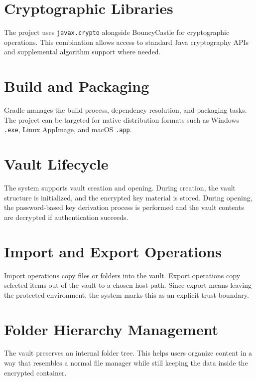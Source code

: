 \section{Cryptographic Libraries}
The project uses \texttt{javax.crypto} alongside BouncyCastle  \cite{bouncycastle} for cryptographic operations. This combination allows access to standard Java cryptography APIs and supplemental algorithm support where needed.

\section{Build and Packaging}
Gradle  manages the build process, dependency resolution, and packaging tasks. The project can be targeted for native distribution formats such as Windows \texttt{.exe}, Linux AppImage, and macOS \texttt{.app}.

\section{Vault Lifecycle}
The system supports vault creation and opening. During creation, the vault structure is initialized, and the encrypted key material is stored. During opening, the password-based key derivation process is performed and the vault contents are decrypted if authentication succeeds.

\section{Import and Export Operations}
Import operations copy files or folders into the vault. Export operations copy selected items out of the vault to a chosen host path. Since export means leaving the protected environment, the system marks this as an explicit trust boundary.

\section{Folder Hierarchy Management}
The vault preserves an internal folder tree. This helps users organize content in a way that resembles a normal file manager while still keeping the data inside the encrypted container.


